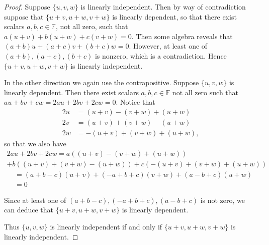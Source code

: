 \documentclass[11pt]{article}
\newcommand{\br}[1]{\left(#1\right)}
\newcommand{\cbr}[1]{\{#1\}}
\begin{document}
\begin{proof}
    Suppose $\cbr{u,v,w}$ is linearly independent. Then by way of contradiction suppose that $\cbr{u+v,u+w,v+w}$ is linearly dependent, so that there exist scalars $a,b,c\in\mathbb{F}$, not all zero, such that $a(u+v)+b(u+w)+c(v+w) = 0$. Then some algebra reveals that $\br{a+b}u + \br{a+c}v + \br{b+c}w = 0$. However, at least one of $\br{a+b}, \br{a+c}, \br{b+c}$ is nonzero, which is a contradiction. Hence $\cbr{u+v,u+w,v+w}$ is linearly independent.

    In the other direction we again use the contrapositive. Suppose $\cbr{u,v,w}$ is linearly dependent. Then there exist scalars $a,b,c\in\mathbb{F}$ not all zero such that $au+bv+cw = 2au+2bv+2cw = 0$. Notice that 
    \begin{align*}
        2u &= \br{u+v}-\br{v+w}+\br{u+w} \\
        2v &= \br{u+v}+\br{v+w}-\br{u+w} \\
        2w &= -\br{u+v}+\br{v+w}+\br{u+w},
    \end{align*}
    so that we also have
    \begin{multline*}
        2au+2bv+2cw = a\br{\br{u+v}-\br{v+w}+\br{u+w}} \\+ b\br{\br{u+v}+\br{v+w}-\br{u+w}} + c\br{-\br{u+v}+\br{v+w}+\br{u+w}} 
    \end{multline*}
    \begin{align*}
        &= \br{a+b-c}\br{u+v} + \br{-a+b+c}\br{v+w} + \br{a-b+c}\br{u+w}\\
        &= 0
    \end{align*}

    Since at least one of $\br{a+b-c}, \br{-a+b+c}, \br{a-b+c}$ is not zero, we can deduce that $\cbr{u+v,u+w,v+w}$ is linearly dependent.

Thus $\cbr{u,v,w}$ is linearly independent if and only if $\cbr{u+v,u+w,v+w}$ is linearly independent.
\end{proof}
\end{document}

